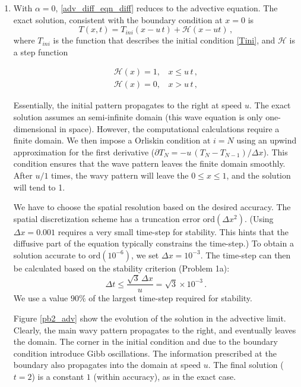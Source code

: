 \documentclass[11pt]{article}
\newcommand{\ord}{\mbox{ord}}
\def\beq{\begin{equation}}
\def\eeq{\end{equation}}
\begin{document}
\begin{enumerate}[label=(\alph*)]

    \item With $\alpha = 0$, \eqref{adv_diff_eqn_diff} reduces to the advective equation. The exact solution, consistent with the boundary condition at $x = 0$ is
        \beq
        T(x,t) = T_{ini}\left(x - u\, t \right) + \mathcal{H}(x-ut)\, ,
        \eeq
        where $T_{ini}$ is the function that describes the initial condition \eqref{Tini}, and $\mathcal{H}$ is a step function

        \begin{align}
            \mathcal{H}(x) = 1, \:\:\:\: x\leq u\,t \, , \nonumber \\
            \mathcal{H}(x) = 0, \:\:\:\: x > u\,t \, ,
        \end{align}
        
        Essentially, the initial pattern propagates to the right at speed $u$. The exact solution assumes an semi-infinite domain (this wave equation is only one-dimensional in space). However, the computational calculations require a finite domain. We then impose a Orliskin condition at $i = N$ using an upwind approximation for the first derivative ($\partial T_N = - u\, \left(T_{N} - T_{N-1}\right)/\Delta x$). This condition ensures that the wave pattern leaves the finite domain smoothly. After $u/1$ times, the wavy pattern will leave the $0\leq x \leq 1 $, and the solution will tend to 1.

        We have to choose the spatial resolution based on the desired accuracy. The spatial discretization scheme has a truncation error $\ord{(\Delta x^2)}$. (Using $\Delta x = 0.001$ requires a very small time-step for stability. This hints that the diffusive part of the equation typically constrains the time-step.) To obtain a solution accurate to $\ord{(10^{-6})}$, we set $\Delta x = 10^{-3}$. The time-step can then be calculated based on the stability criterion (Problem 1a):
        \beq
        \Delta t \leq \frac{\sqrt{3}\, \Delta x}{u} = \sqrt{3} \times 10^{-3}\, .
        \eeq
        We use a value $90 \%$ of the largest time-step required for stability.


        Figure \ref{pb2_adv} show the evolution of the solution in the advective limit. Clearly, the main wavy pattern propagates to the right, and eventually leaves the domain. The corner in the initial condition and due to the boundary condition introduce Gibb oscillations. The information prescribed at the boundary also propagates into the domain at speed $u$. The final solution ($t=2$) is a constant $1$ (within accuracy), as in the exact case.  


\end{enumerate}
\end{document}
